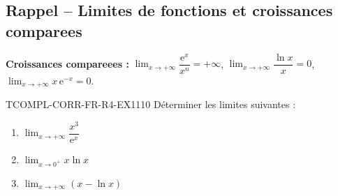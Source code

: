 

\subsection*{Rappel -- Limites de fonctions et croissances comparees}

\textbf{Croissances compareees :} $\lim_{x \to +\infty} \dfrac{\mathrm{e}^x}{x^n} = +\infty$, $\lim_{x \to +\infty} \dfrac{\ln x}{x} = 0$, $\lim_{x \to +\infty} x\,\mathrm{e}^{-x} = 0$.

\begin{exercice}{TCOMPL-CORR-FR-R4-EX1}{1}{10}
Déterminer les limites suivantes :
\begin{enumerate}
  \item $\lim_{x \to +\infty} \dfrac{x^3}{\mathrm{e}^x}$
  \item $\lim_{x \to 0^+} x \ln x$
  \item $\lim_{x \to +\infty} \left(x - \ln x\right)$
\end{enumerate}
\end{exercice}

